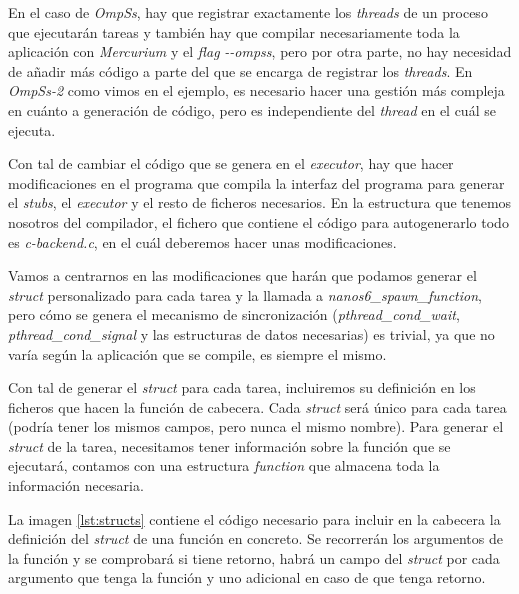 En el caso de \textit{OmpSs}, hay que registrar exactamente los \textit{threads} de un proceso que ejecutarán tareas y también hay que compilar necesariamente toda la aplicación con \textit{Mercurium} y el \textit{flag} \textit{-{}-ompss}, pero por otra parte, no hay necesidad de añadir más código a parte del que se encarga de registrar los \textit{threads}. En \textit{OmpSs-2} como vimos en el ejemplo, es necesario hacer una gestión más compleja en cuánto a generación de código, pero es independiente del \textit{thread} en el cuál se ejecuta.
\par\bigskip
Con tal de cambiar el código que se genera en el \textit{executor}, hay que hacer modificaciones en el programa que compila la interfaz del programa para generar el \textit{stubs}, el \textit{executor} y el resto de ficheros necesarios. En la estructura que tenemos nosotros del compilador, el fichero que contiene el código para autogenerarlo todo es \textit{c-backend.c}, en el cuál deberemos hacer unas modificaciones.
\par\smallskip
Vamos a centrarnos en las modificaciones que harán que podamos generar el \textit{struct} personalizado para cada tarea y la llamada a \textit{nanos6\_spawn\_function}, pero cómo se genera el mecanismo de sincronización  (\textit{pthread\_cond\_wait}, \textit{pthread\_cond\_signal} y las estructuras de datos necesarias) es trivial, ya que no varía según la aplicación que se compile, es siempre el mismo.
\par\bigskip
Con tal de generar el \textit{struct} para cada tarea, incluiremos su definición en los ficheros que hacen la función de cabecera. Cada \textit{struct} será único para cada tarea (podría tener los mismos campos, pero nunca el mismo nombre). Para generar el \textit{struct} de la tarea, necesitamos tener información sobre la función que se ejecutará, contamos con una estructura \textit{function} que almacena toda la información necesaria.
\par\bigskip

La imagen \ref{lst:structs} contiene el código necesario para incluir en la cabecera la definición del \textit{struct} de una función en concreto. Se recorrerán los argumentos de la función y se comprobará si tiene retorno, habrá un campo del \textit{struct} por cada argumento que tenga la función y uno adicional en caso de que tenga retorno.

\bigskip

